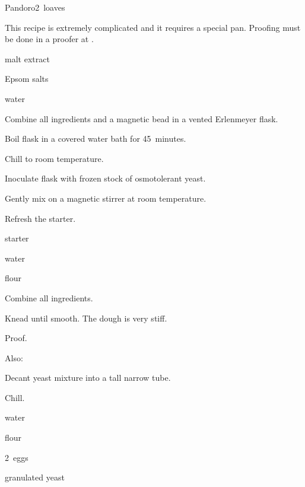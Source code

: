 \begin{recipe}{Pandoro}{}{2~loaves}

This recipe is extremely complicated and it requires a special pan. Proofing must be done in a proofer at .

\begin{ingredients}
\item {} malt extract
\item {} Epsom salts
\item {} water
\end{ingredients}

\begin{directions}
\item Combine all ingredients and a magnetic bead in a vented  Erlenmeyer flask.
\item Boil flask in a covered water bath for 45~minutes.
\item Chill to room temperature.
\item Inoculate flask with frozen stock of osmotolerant yeast.
\item Gently mix on a magnetic stirrer at room temperature. 
\end{directions}

Refresh the starter.

\begin{ingredients}
\item {} starter
\item {} water
\item {} flour
\end{ingredients}

\begin{directions}
\item Combine all ingredients.
\item Knead until smooth. The dough is very stiff.
\item Proof.
\end{directions}

Also:

\begin{directions}
\item Decant yeast mixture into a tall narrow tube.
\item Chill.
\end{directions}

\begin{ingredients}
\item {} water
\item {} flour
\item 2~eggs
\item {} granulated yeast
\end{ingredients}


\end{recipe}
